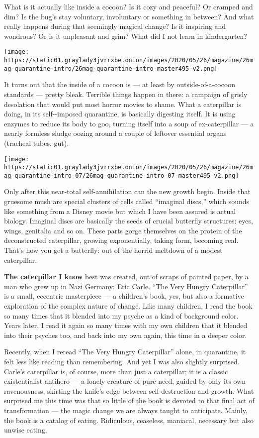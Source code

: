 What is it actually like inside a cocoon? Is it cozy and peaceful? Or
cramped and dim? Is the bug's stay voluntary, involuntary or something
in between? And what really happens during that seemingly magical
change? Is it inspiring and wondrous? Or is it unpleasant and grim? What
did I not learn in kindergarten?

\texttt{[image: https://static01.graylady3jvrrxbe.onion/images/2020/05/26/magazine/26mag-quarantine-intro/26mag-quarantine-intro-master495-v2.png]}

It turns out that the inside of a cocoon is --- at least by
outside-of-a-cocoon standards --- pretty bleak. Terrible things happen
in there: a campaign of grisly desolation that would put most horror
movies to shame. What a caterpillar is doing, in its self-\/-imposed
quarantine, is basically digesting itself. It is using enzymes to reduce
its body to goo, turning itself into a soup of ex-caterpillar --- a
nearly formless sludge oozing around a couple of leftover essential
organs (tracheal tubes, gut).

\texttt{[image: https://static01.graylady3jvrrxbe.onion/images/2020/05/26/magazine/26mag-quarantine-intro-07/26mag-quarantine-intro-07-master495-v2.png]}

Only after this near-total self-annihilation can the new growth begin.
Inside that gruesome mush are special clusters of cells called
``imaginal discs,'' which sounds like something from a Disney movie but
which I have been assured is actual biology. Imaginal discs are
basically the seeds of crucial butterfly structures: eyes, wings,
genitalia and so on. These parts gorge themselves on the protein of the
deconstructed caterpillar, growing exponentially, taking form, becoming
real. That's how you get a butterfly: out of the horrid meltdown of a
modest caterpillar.

\textbf{The caterpillar I know} best was created, out of scraps of
painted paper, by a man who grew up in Nazi Germany: Eric Carle. ``The
Very Hungry Caterpillar'' is a small, eccentric masterpiece --- a
children's book, yes, but also a formative exploration of the complex
nature of change. Like many children, I read the book so many times that
it blended into my psyche as a kind of background color. Years later, I
read it again so many times with my own children that it blended into
their psyches too, and back into my own again, this time in a deeper
color.

Recently, when I reread ``The Very Hungry Caterpillar'' alone, in
quarantine, it felt less like reading than remembering. And yet I was
also slightly surprised. Carle's caterpillar is, of course, more than
just a caterpillar; it is a classic existentialist antihero --- a lonely
creature of pure need, guided by only its own ravenousness, skirting the
knife's edge between self-destruction and growth. What surprised me this
time was that so little of the book is devoted to that final act of
transformation --- the magic change we are always taught to anticipate.
Mainly, the book is a catalog of eating. Ridiculous, ceaseless,
maniacal, necessary but also unwise eating.

